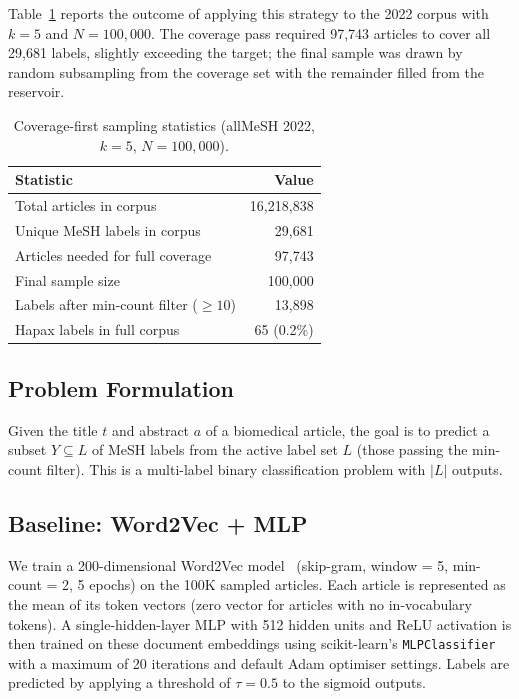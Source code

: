 \documentclass[sigconf]{acmart}
\begin{document}
Table~\ref{tab:sampling} reports the outcome of applying this strategy to the 2022 corpus with
$k = 5$ and $N = 100{,}000$. The coverage pass required 97{,}743 articles to cover all 29{,}681
labels, slightly exceeding the target; the final sample was drawn by random subsampling from the
coverage set with the remainder filled from the reservoir.

\begin{table}[h]
\caption{Coverage-first sampling statistics (allMeSH 2022, $k=5$, $N=100{,}000$).}
\label{tab:sampling}
\begin{tabular}{lr}
\toprule
\textbf{Statistic} & \textbf{Value} \\
\midrule
Total articles in corpus          & 16{,}218{,}838 \\
Unique MeSH labels in corpus      & 29{,}681 \\
Articles needed for full coverage & 97{,}743 \\
Final sample size                 & 100{,}000 \\
Labels after min-count filter ($\geq10$) & 13{,}898 \\
Hapax labels in full corpus       & 65 (0.2\%) \\
\bottomrule
\end{tabular}
\end{table}

\subsection{Problem Formulation}

Given the title $t$ and abstract $a$ of a biomedical article, the goal is to predict a subset
$\hat{Y} \subseteq L$ of MeSH labels from the active label set $L$ (those passing the
min-count filter). This is a multi-label binary classification problem with $|L|$ outputs.

\subsection{Baseline: Word2Vec + MLP}

We train a 200-dimensional Word2Vec model~\cite{mikolov2013} (skip-gram, window = 5, min-count = 2,
5 epochs) on the 100K sampled articles. Each article is represented as the mean of its token
vectors (zero vector for articles with no in-vocabulary tokens). A single-hidden-layer MLP with
512 hidden units and ReLU activation is then trained on these document embeddings using
scikit-learn's \texttt{MLPClassifier} with a maximum of 20 iterations and default Adam optimiser
settings. Labels are predicted by applying a threshold of $\tau = 0.5$ to the sigmoid outputs.
\end{document}

